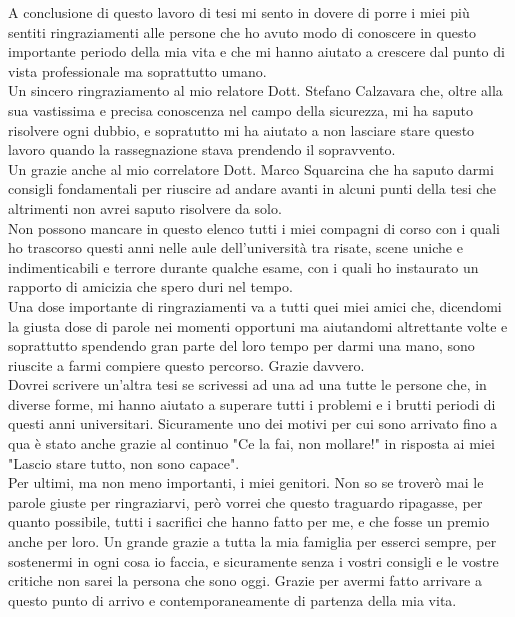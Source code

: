 \documentclass[11pt ,a4paper , twoside , openright ]{book}
\begin{document}
	\begin{flushleft}
		A conclusione di questo lavoro di tesi mi sento in dovere di porre i miei più sentiti ringraziamenti alle persone che ho avuto modo di conoscere in questo importante periodo della mia vita e che mi hanno aiutato a crescere dal punto di vista professionale ma soprattutto umano.
		\\
		Un sincero ringraziamento al mio relatore Dott. Stefano Calzavara che, oltre alla sua vastissima e precisa conoscenza nel campo della sicurezza, mi ha saputo risolvere ogni dubbio, e sopratutto mi ha aiutato a non lasciare stare questo lavoro quando la rassegnazione stava prendendo il sopravvento.
		\\
		Un grazie anche al mio correlatore Dott. Marco Squarcina che ha saputo darmi consigli fondamentali per riuscire ad andare avanti in alcuni punti della tesi che altrimenti non avrei saputo risolvere da solo.
		\\
		Non possono mancare in questo elenco tutti i miei compagni di corso con i quali ho trascorso questi anni nelle aule dell'università tra risate, scene uniche e indimenticabili e terrore durante qualche esame, con i quali ho instaurato un rapporto di amicizia che spero duri nel tempo.
		\\
		Una dose importante di ringraziamenti va a tutti quei miei amici che, dicendomi la giusta dose di parole nei momenti opportuni ma aiutandomi altrettante volte e soprattutto spendendo gran parte del loro tempo per darmi una mano, sono riuscite a farmi compiere questo percorso. Grazie davvero.
		\\
		Dovrei scrivere un'altra tesi se scrivessi ad una ad una tutte le persone che, in diverse forme, mi hanno aiutato a superare tutti i problemi e i brutti periodi di questi anni universitari. Sicuramente uno dei motivi per cui sono arrivato fino a qua è stato anche grazie al continuo "Ce la fai, non mollare!" in risposta ai miei "Lascio stare tutto, non sono capace". 
		\\
		Per ultimi, ma non meno importanti, i miei genitori.
		Non so se troverò mai le parole giuste per ringraziarvi, però vorrei che questo traguardo ripagasse, per quanto possibile, tutti i sacrifici che hanno fatto per me, e che fosse un premio anche per loro.
		Un grande grazie a tutta la mia famiglia per esserci sempre, per sostenermi in ogni cosa io faccia, e sicuramente senza i vostri consigli e le vostre critiche non sarei la persona che sono oggi.
		Grazie per avermi fatto arrivare a questo punto di arrivo e contemporaneamente di partenza della mia vita.
	\end{flushleft}
\cleardoublepage
\listoffigures
\cleardoublepage
	
	
\end{document}
